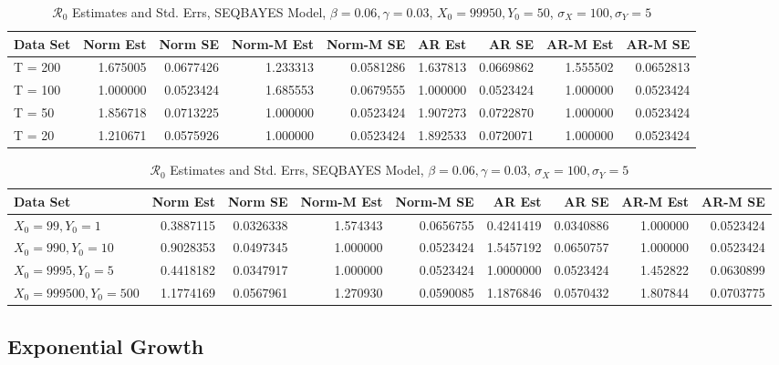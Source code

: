 \documentclass[12pt]{article}
\newcommand{\rr}{\ensuremath{\mathcal{R}_0}}
\begin{document}
\begin{table}[H]
	
	\caption{\label{tab:}$\rr$ Estimates and Std. Errs, SEQBAYES Model,
		$\beta = 0.06, \gamma = 0.03$, $X_0 = 99950, Y_0 = 50$, $\sigma_X = 100, \sigma_Y = 5$}
	\centering
	\begin{tabular}[t]{l|r|r|r|r|r|r|r|r}
		\hline
		Data Set & Norm Est & Norm SE & Norm-M Est & Norm-M SE & AR Est & AR SE & AR-M Est & AR-M SE\\
		\hline
		T = 200 & 1.675005 & 0.0677426 & 1.233313 & 0.0581286 & 1.637813 & 0.0669862 & 1.555502 & 0.0652813\\
		\hline
		T = 100 & 1.000000 & 0.0523424 & 1.685553 & 0.0679555 & 1.000000 & 0.0523424 & 1.000000 & 0.0523424\\
		\hline
		T = 50 & 1.856718 & 0.0713225 & 1.000000 & 0.0523424 & 1.907273 & 0.0722870 & 1.000000 & 0.0523424\\
		\hline
		T = 20 & 1.210671 & 0.0575926 & 1.000000 & 0.0523424 & 1.892533 & 0.0720071 & 1.000000 & 0.0523424\\
		\hline
	\end{tabular}
\end{table}

\begin{table}[H]
	
	\caption{\label{tab:}$\rr$ Estimates and Std. Errs, SEQBAYES Model,
		$\beta = 0.06, \gamma = 0.03$, $\sigma_X = 100, \sigma_Y = 5$}
	\centering
	\begin{tabular}[t]{l|r|r|r|r|r|r|r|r}
		\hline
		Data Set & Norm Est & Norm SE & Norm-M Est & Norm-M SE & AR Est & AR SE & AR-M Est & AR-M SE\\
		\hline
		$X_0 = 99, Y_0 = 1$ & 0.3887115 & 0.0326338 & 1.574343 & 0.0656755 & 0.4241419 & 0.0340886 & 1.000000 & 0.0523424\\
		\hline
		$X_0 = 990, Y_0 = 10$ & 0.9028353 & 0.0497345 & 1.000000 & 0.0523424 & 1.5457192 & 0.0650757 & 1.000000 & 0.0523424\\
		\hline
		$X_0 = 9995, Y_0 = 5$ & 0.4418182 & 0.0347917 & 1.000000 & 0.0523424 & 1.0000000 & 0.0523424 & 1.452822 & 0.0630899\\
		\hline
		$X_0 = 999500, Y_0 = 500$ & 1.1774169 & 0.0567961 & 1.270930 & 0.0590085 & 1.1876846 & 0.0570432 & 1.807844 & 0.0703775\\
		\hline
	\end{tabular}
\end{table}

\subsection{Exponential Growth}
\end{document}
